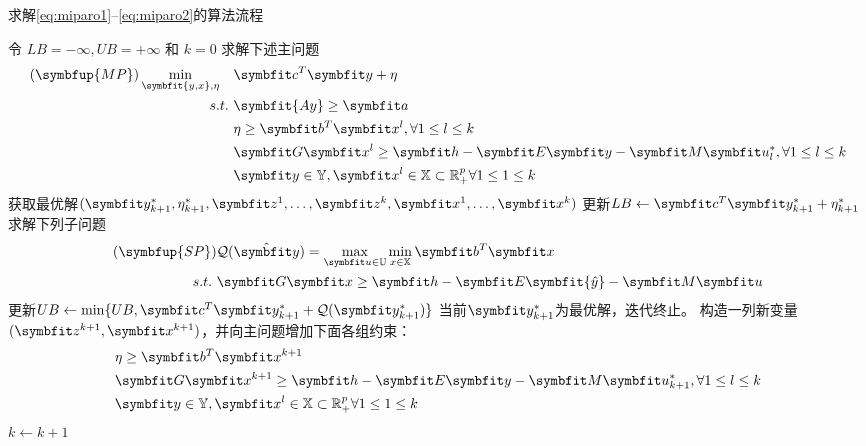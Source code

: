 \begin{algorithm}
  \caption{求解\eqref{eq:miparo1}--\eqref{eq:miparo2}的算法流程} \label{alg:nccg}
  \small
  \begin{algorithmic}
    \STATE{} 令 $LB=-\infty, UB=+\infty$ 和 $k = 0$
    \STATE{} 求解下述主问题
    \begin{align}
      (\symbfup{MP})\min_{\symbfit{y,x},\eta}\quad & \symbfit c^T\symbfit y+\eta \\
      s.t.\ & \symbfit{Ay}\ge \symbfit a \\
      & \eta \ge \symbfit b^T\symbfit x^{l}, \forall 1\le l \le k \\
      & \symbfit G \symbfit x^l \ge \symbfit h - \symbfit E \symbfit y - \symbfit M \symbfit u_l^*, \forall 1\le l\le k \\
      &\symbfit y\in\mathbb Y, \symbfit x^l\in \mathbb X\subset\mathbb R_+^p\forall 1\le 1\le k
    \end{align}
    \STATE{} 获取最优解$(\symbfit y_{k+1}^*, \eta_{k+1}^*, \symbfit z^1, \dots, \symbfit z^k, \symbfit x^1, \dots, \symbfit x^k)$
    \STATE{} 更新$LB\leftarrow \symbfit c^T\symbfit y_{k+1}^*+\eta_{k+1}^*$
    \STATE{} 求解下列子问题
    \begin{align}
      (\symbfup{SP})& \mathcal{Q}(\hat{\symbfit y})=\max_{\symbfit u\in\mathbb U}\min_{x\in\mathbb X} \symbfit b^T\symbfit x \\
      s.t.\ & \symbfit G \symbfit x \ge \symbfit h - \symbfit E \symbfit{\hat{y}}  - \symbfit M \symbfit u
    \end{align}
    \STATE{} 更新$UB\leftarrow \min\{UB, \symbfit c^T\symbfit y_{k+1}^*+\mathcal Q(\symbfit y_{k+1}^*)\}$
        \STATE{} 当前$\symbfit y_{k+1}^*$为最优解，迭代终止。
      \ELSE[]
      \STATE{} 构造一列新变量$(\symbfit z^{k+1}, \symbfit x^{k+1})$，并向主问题增加下面各组约束：
      \begin{align}
        & \eta \ge \symbfit b^T\symbfit x^{k+1} \\
      & \symbfit G \symbfit x^{k+1} \ge \symbfit h - \symbfit E \symbfit y - \symbfit M \symbfit u_{k+1}^*, \forall 1\le l\le k \\
      &\symbfit y\in\mathbb Y, \symbfit x^l\in \mathbb X\subset\mathbb R_+^p\forall 1\le 1\le k
      \end{align}
      \STATE{} $k\leftarrow k+1$
      \ENDIF{}
    \ENDWHILE{}
  \end{algorithmic}
\end{algorithm}

